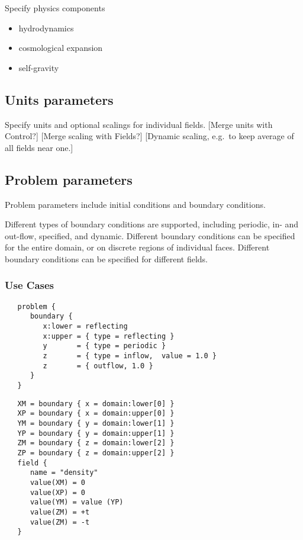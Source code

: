 Specify physics components

\begin{itemize}
\item hydrodynamics
\item  cosmological expansion
\item self-gravity
\end{itemize}


\subsection{Units parameters} \label{ss:params-units}


 Specify units and optional scalings for individual
 fields.  [Merge units with Control?] [Merge scaling with Fields?] 
 [Dynamic scaling, e.g.~to keep average of all fields near one.]

\subsection{Problem parameters} \label{ss:parms-problem}

Problem parameters include initial conditions and boundary conditions.

Different types of boundary conditions are supported, including
periodic, in- and out-flow, specified, and dynamic.  Different
boundary conditions can be specified for the entire domain, or on
discrete regions of individual faces.  Different boundary conditions
can be specified for different fields.

\subsubsection{Use Cases}

\begin{verbatim}
   problem {
      boundary {
         x:lower = reflecting
         x:upper = { type = reflecting }
         y       = { type = periodic }
         z       = { type = inflow,  value = 1.0 }
         z       = { outflow, 1.0 }
      }
   }
\end{verbatim}

\begin{verbatim}
   XM = boundary { x = domain:lower[0] }
   XP = boundary { x = domain:upper[0] }
   YM = boundary { y = domain:lower[1] }
   YP = boundary { y = domain:upper[1] }
   ZM = boundary { z = domain:lower[2] }
   ZP = boundary { z = domain:upper[2] }
   field {
      name = "density"
      value(XM) = 0
      value(XP) = 0
      value(YM) = value (YP)
      value(ZM) = +t
      value(ZM) = -t
   }
\end{verbatim}

